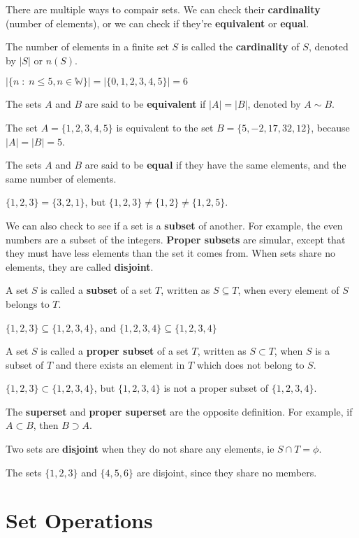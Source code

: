 There are multiple ways to compair sets. We can check their {\bf cardinality} (number of elements), or we can check if they're {\bf equivalent} or {\bf equal}.

\mydefine
{
	The number of elements in a finite set $S$ is called the {\bf cardinality} of $S$, denoted by $|S|$ or $n(S)$.
}

\myexample
{
	$|\{ n \;:\; n \leq 5, n \in \mathbb{W}\}| = |\{0,1,2,3,4,5\}| = 6$
}

\mydefine
{
	The sets $A$ and $B$ are said to be {\bf equivalent} if $|A| = |B|$, denoted by $A \sim B$.
}

\myexample
{
	The set $A = \{1,2,3,4,5\}$ is equivalent to the set $B = \{5,-2,17,32,12\}$, because $|A| = |B| = 5$.
}

\mydefine
{
	The sets $A$ and $B$ are said to be {\bf equal} if they have the same elements, and the same number of elements.
}

\myexample
{
	$\{1,2,3\} = \{3,2,1\}$, but $\{1,2,3\} \ne \{1,2\} \ne \{1,2,5\}$.
}

We can also check to see if a set is a {\bf subset} of another. For example, the even numbers are a subset of the integers. {\bf Proper subsets} are simular, except that they must have less elements than the set it comes from. When sets share no elements, they are called {\bf disjoint}.

\mydefine
{
	A set $S$ is called a {\bf subset} of a set $T$, written as $S \subseteq T$, when every element of $S$ belongs to $T$.
}

\myexample
{
	$\{1,2,3\} \subseteq \{1,2,3,4\}$, and $\{1,2,3,4\} \subseteq \{1,2,3,4\}$
}

\mydefine
{
	A set $S$ is called a {\bf proper subset} of a set $T$, written as $S \subset T$, when $S$ is a subset of $T$ and there exists an element in $T$ which does not belong to $S$.
}

\myexample
{
	$\{1,2,3\} \subset \{1,2,3,4\}$, but $\{1,2,3,4\}$ is not a proper subset of $\{1,2,3,4\}$.
}

The {\bf superset} and {\bf proper superset} are the opposite definition. For example, if $A \subset B$, then $B \supset A$.

\mydefine
{
	Two sets are {\bf disjoint} when they do not share any elements, ie $S \cap T=\phi$.
}

\myexample
{
	The sets $\{1,2,3\}$ and $\{4,5,6\}$ are disjoint, since they share no members.
}



\section{Set Operations}


